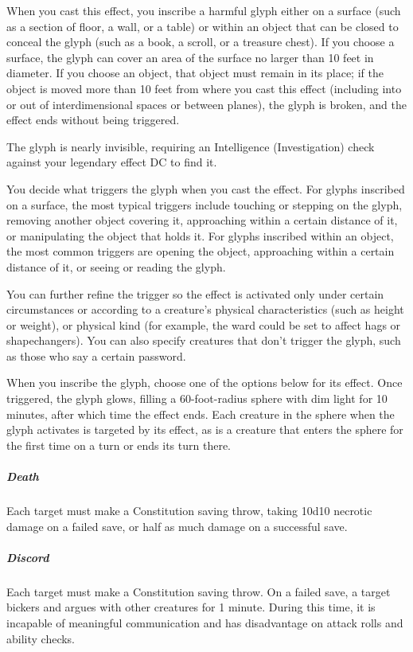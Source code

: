 When you cast this effect, you inscribe a harmful glyph either on a surface (such as a section of floor, a wall, or a table) or within an object that can be closed to conceal the glyph (such as a book, a scroll, or a treasure chest). If you choose a surface, the glyph can cover an area of the surface no larger than 10 feet in diameter. If you choose an object, that object must remain in its place; if the object is moved more than 10 feet from where you cast this effect (including into or out of interdimensional spaces or between planes), the glyph is broken, and the effect ends without being triggered.

The glyph is nearly invisible, requiring an Intelligence (Investigation) check against your legendary effect DC to find it.

You decide what triggers the glyph when you cast the effect. For glyphs inscribed on a surface, the most typical triggers include touching or stepping on the glyph, removing another object covering it, approaching within a certain distance of it, or manipulating the object that holds it. For glyphs inscribed within an object, the most common triggers are opening the object, approaching within a certain distance of it, or seeing or reading the glyph.

You can further refine the trigger so the effect is activated only under certain circumstances or according to a creature’s physical characteristics (such as height or weight), or physical kind (for example, the ward could be set to affect hags or shapechangers). You can also specify creatures that don’t trigger the glyph, such as those who say a certain password.

When you inscribe the glyph, choose one of the options below for its effect. Once triggered, the glyph glows, filling a 60-foot-radius sphere with dim light for 10 minutes, after which time the effect ends. Each creature in the sphere when the glyph activates is targeted by its effect, as is a creature that enters the sphere for the first time on a turn or ends its turn there.

\subparagraph{Death} Each target must make a Constitution saving throw, taking 10d10 necrotic damage on a failed save, or half as much damage on a successful save.

\subparagraph{Discord} Each target must make a Constitution saving throw. On a failed save, a target bickers and argues with other creatures for 1 minute. During this time, it is incapable of meaningful communication and has disadvantage on attack rolls and ability checks.

